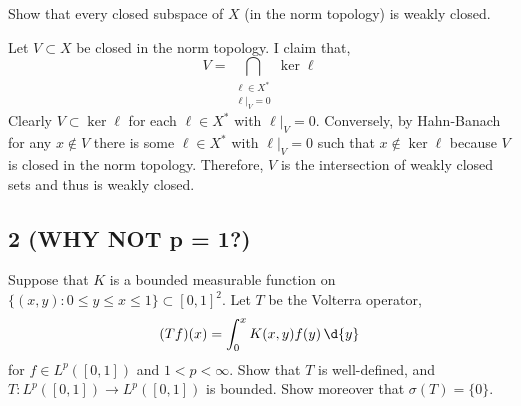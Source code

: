 \documentclass[12pt]{article}
\begin{document}
\begin{exercise}
Show that every closed subspace of $X$ (in the norm topology) is weakly closed.
\end{exercise}

Let $V \subset X$ be closed in the norm topology. I claim that,
\[ V = \bigcap_{\substack{ \ell \in X^* \\
\ell|_V  = 0 }} \ker{\ell} \]
Clearly $V \subset \ker{\ell}$ for each $\ell \in X^*$ with $\ell|_V = 0$. Conversely, by Hahn-Banach for any $x \notin V$ there is some $\ell \in X^*$ with $\ell|_V = 0$ such that $x \notin \ker{\ell}$ because $V$ is closed in the norm topology. Therefore, $V$ is the intersection of weakly closed sets and thus is weakly closed.

\subsection{2 (WHY NOT p = 1?)}

\begin{exercise}
Suppose that $K$ is a bounded measurable function on $\{ (x,y) : 0 \le y \le x \le 1 \} \subset [0,1]^2$. Let $T$ be the Volterra operator,
\[ (T f)(x) = \int_0^x K(x, y) f(y) \, \d{y} \]
for $f \in L^p([0,1])$ and $1 < p < \infty$. Show that $T$ is well-defined, and $T : L^p([0,1]) \to L^p([0,1])$ is bounded. Show moreover that $\sigma(T) = \{ 0 \}$.
\end{exercise}
\end{document}

